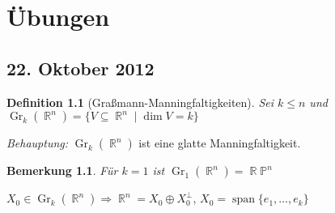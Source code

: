 \documentclass[paper=A4, twoside, chapterprefix=true, bibliography=totoc, headsepline]{scrbook}
\renewcommand{\thesection}{\arabic{section}}
\renewcommand*{\sectionmarkformat}{\thesection\autodot\enskip}
\DeclareMathOperator{\R}{\mathbb{R}}
\renewcommand{\P}{\ensuremath{\mathbb{P}}}
\DeclareMathOperator{\mspan}{span}  %
\DeclareMathOperator{\Gr}{Gr}
\theoremstyle{plain}
\theoremstyle{nonumberplain}
\newtheorem{dfn}{Definition}
\newtheorem{bem}{Bemerkung}
\theoremstyle{empty}
\theoremstyle{break}
\begin{document}



\appendix


\renewcommand*{\othersectionlevelsformat}[3]{\ifstr{#1}{section}{\"Ubung\ #3\ vom\ }{#3\autodot\enskip}}

\renewcommand*{\sectionmarkformat}{\"Ubung \thesection\autodot\ vom\enskip}


\chapter{\"Ubungen}
\setcounter{section}{-1}

\section{22. Oktober 2012}
\setcounter{Aufg}{0} %
\setcounter{Loes}{0}

\begin{dfn}[Gra\ss mann-Manningfaltigkeiten]
Sei $k \le n$ und $\Gr_k(\R^n) = \{ V \subseteq \R^n \mid \dim V = k\}$
\end{dfn}

\emph{Behauptung:} $\Gr_k(\R^n)$ ist eine glatte Manningfaltigkeit.

\begin{bem}
F\"ur $k = 1$ ist $\Gr_1(\R^n) = \R \P^n$
\end{bem}

$X_0 \in \Gr_k(\R^n) \Rightarrow \R^n = X_0 \oplus X_0^\perp$, $X_0 = \mspan\{e_1,\ldots ,e_k\}$ 
\end{document}
